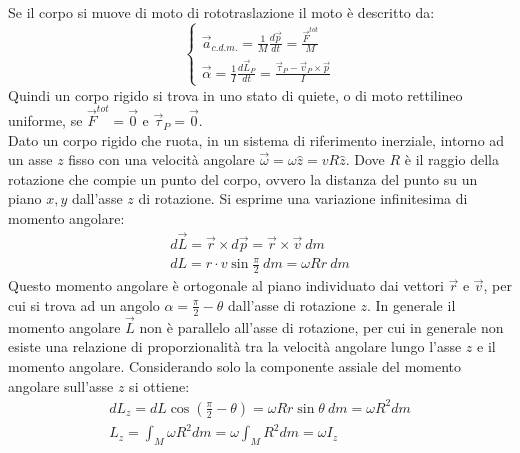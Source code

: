 \documentclass{article}
\numberwithin{equation}{subsection}
\begin{document}
Se il corpo si muove di moto di rototraslazione il moto è descritto da:
\begin{equation}
    \begin{cases}
        \vec{a}_{c.d.m.}=\displaystyle\frac{1}{M}\frac{d\vec{p}}{dt}=\frac{\vec{F}^{tot}}{M}\\
        \vec{\alpha}=\displaystyle\frac{1}{I}\frac{d\vec{L}_P}{dt}=\frac{\vec{\tau}_P-\vec{v}_P\times\vec{p}}{I}
    \end{cases}
\end{equation}
Quindi un corpo rigido si trova in uno stato di quiete, o di moto rettilineo uniforme, se $\vec{F}^{tot}=\vec{0}$ e $\vec{\tau}_P=\vec{0}$. 
\\
Dato un corpo rigido che ruota, in un sistema di riferimento inerziale, intorno ad un asse $z$ fisso con una 
velocità angolare $\vec{\omega}=\omega\hat{z}=vR\hat{z}$. Dove 
$R$ è il raggio della rotazione che compie un punto del corpo, ovvero la distanza del punto su un piano $x,y$ 
dall'asse $z$ di rotazione. Si esprime una variazione infinitesima di momento angolare: 
\begin{gather*}
    d\vec{L}=\vec{r}\times d\vec{p}=\vec{r}\times\vec{v}\:dm\\
    dL=r\cdot v\sin\displaystyle\frac{\pi}{2}\:dm=\omega Rr\:dm
\end{gather*}
Questo momento angolare è ortogonale al piano individuato dai vettori $\vec{r}$ e $\vec{v}$, per cui si trova ad un angolo $\alpha=\displaystyle\frac{\pi}{2}-\theta$ dall'asse 
di rotazione $z$. In generale il momento angolare $\vec{L}$ non è parallelo all'asse di rotazione, per cui in generale non esiste una relazione di proporzionalità tra la velocità angolare 
lungo l'asse $z$ e il momento angolare. Considerando solo la componente assiale del momento angolare sull'asse $z$ si ottiene: 
\begin{gather*}
    dL_z=dL\cos\left(\displaystyle\frac{\pi}{2}-\theta\right)=\omega Rr\sin\theta\:dm=\omega R^2dm\\
    L_z=\displaystyle\int_M\omega R^2dm=\omega\int_M R^2dm=\omega I_z
\end{gather*}
\end{document}
